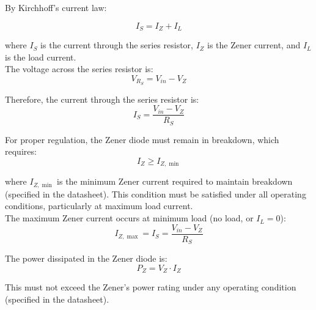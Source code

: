 \documentclass[10pt]{article}
\begin{document}
By Kirchhoff's current law: 

\begin{equation}
    I_S = I_Z + I_L
    \label{eq:kcl_reg}
\end{equation}

where $I_S$ is the current through the series resistor, $I_Z$ is the Zener current, and $I_L$ is the load current. \\

The voltage across the series resistor is: \\

\begin{equation}
    V_{R_S} = V_{in} - V_Z
\end{equation}

Therefore, the current through the series resistor is: \\

\begin{equation}
    I_S = \frac{V_{in} - V_Z}{R_S}
    \label{eq:is_calc}
\end{equation}

For proper regulation, the Zener diode must remain in breakdown, which requires: \\

\begin{equation}
    I_Z \geq I_{Z,\min}
\end{equation}

where $I_{Z,\min}$ is the minimum Zener current required to maintain breakdown (specified in the datasheet). This condition must be satisfied under all operating conditions, particularly at maximum load current.\\

The maximum Zener current occurs at minimum load (no load, or $I_L = 0$):\\

\begin{equation}
    I_{Z,\max} = I_S = \frac{V_{in} - V_Z}{R_S}
\end{equation}

The power dissipated in the Zener diode is:\\

\begin{equation}
    P_Z = V_Z \cdot I_Z
\end{equation}

This must not exceed the Zener's power rating under any operating condition (specified in the datasheet). \\
\end{document}
